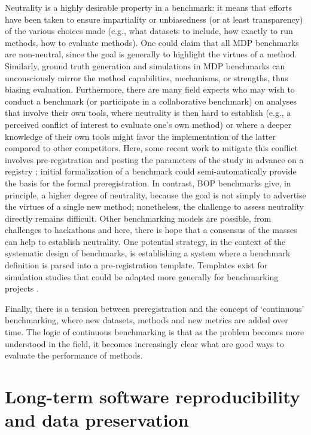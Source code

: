 \documentclass[11pt]{article}
\begin{document}
Neutrality is a highly desirable property in a benchmark: it means that efforts have been taken to ensure impartiality or unbiasedness (or at least transparency) of the various choices made (e.g., what datasets to include, how exactly to run methods, how to evaluate methods). One could claim that all MDP benchmarks are non-neutral, since the goal is generally to highlight the virtues of a method. Similarly, ground truth generation and simulations in MDP benchmarks can unconsciously mirror the method capabilities, mechanisms, or strengths, thus biasing evaluation. Furthermore, there are many field experts who may wish to conduct a benchmark (or participate in a collaborative benchmark) on analyses that involve their own tools, where neutrality is then hard to establish (e.g., a perceived conflict of interest to evaluate one's own method) or where a deeper knowledge of their own tools might favor the implementation of the latter compared to other competitors. Here, some recent work to mitigate this conflict involves pre-registration and posting the parameters of the study in advance on a registry \cite{Sullivan2019-wh, Olevska2021-if}; initial formalization of a benchmark could semi-automatically provide the basis for the formal preregistration. In contrast, BOP benchmarks give, in principle, a higher degree of neutrality, because the goal is not simply to advertise the virtues of a single new method; nonetheless, the challenge to assess neutrality directly remains difficult. Other benchmarking models are possible, from challenges to hackathons and here, there is hope that a consensus of the masses can help to establish neutrality. One potential strategy, in the context of the systematic design of benchmarks, is establishing a system where a benchmark definition is parsed into a pre-registration template. Templates exist for simulation studies that could be adapted more generally for benchmarking projects \cite{Siepe2023-tz}. 

Finally, there is a tension between preregistration and the concept of `continuous' benchmarking, where new datasets, methods and new metrics are added over time. The logic of continuous benchmarking is that as the problem becomes more understood in the field, it becomes increasingly clear what are good ways to evaluate the performance of methods. 

\section*{Long-term software reproducibility and data preservation}
\end{document}
